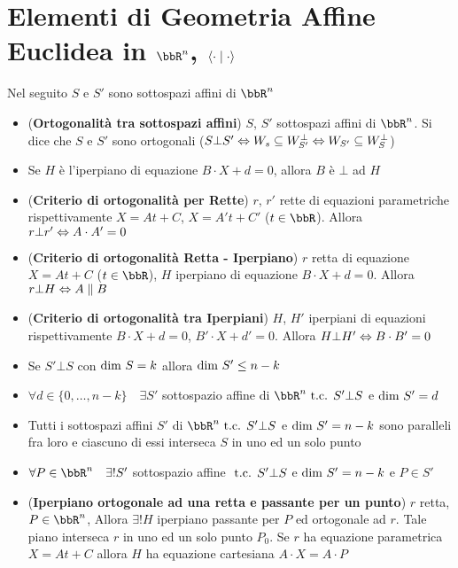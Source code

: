 \documentclass[a4paper,NoNotes,GeneralMath]{stdmdoc}
\begin{document}
	\section*{Elementi di Geometria Affine Euclidea in $\bbR^n$, $\langle \cdot \mid \cdot \rangle$}
	Nel seguito $S$ e $S'$ sono sottospazi affini di $\bbR^n$
	\begin{itemize}
		\item ({\bf Ortogonalità tra sottospazi affini}) $S$, $S'$ sottospazi affini di $\bbR^n$. Si dice che $S$ e $S'$ sono ortogonali ($S \bot S' \Leftrightarrow W_s \subseteq W_{S'}^\bot \Leftrightarrow W_{S'} \subseteq W_{S}^\bot$)
		\item Se $H$ è l'iperpiano di equazione $B\cdot X + d = 0$, allora $B$ è $\bot$ ad $H$		
		\item ({\bf Criterio di ortogonalità per Rette}) $r$, $r'$ rette di equazioni parametriche rispettivamente $X=At+C$, $X=A't+C'$ ($t \in \bbR$). Allora $r \bot r' \Leftrightarrow A\cdot A' = 0$
		\item ({\bf Criterio di ortogonalità Retta - Iperpiano}) $r$ retta di equazione $X=At+C$ ($t \in \bbR$), $H$ iperpiano di equazione $B \cdot X + d = 0$. Allora $r \bot H \Leftrightarrow A \parallel B$
		\item ({\bf Criterio di ortogonalità tra Iperpiani}) $H$, $H'$ iperpiani di equazioni rispettivamente $B \cdot X + d = 0$, $B' \cdot X + d' = 0$. Allora $H \bot H' \Leftrightarrow B \cdot B' = 0$
		\item Se $S' \bot S$ con $\mbox{dim } S = k$ allora $\mbox{dim } S' \le n-k$
		\item $\forall d \in \{0, \ldots, n-k\} \quad \exists S'$ sottospazio affine di $\bbR^n \tc S' \bot S$ e $\mbox{dim } S' = d$
		\item Tutti i sottospazi affini $S'$ di $\bbR^n \tc S' \bot S$ e $\mbox{dim } S' = n-k$ sono paralleli fra loro e ciascuno di essi interseca $S$ in uno ed un solo punto
		\item $\forall P \in \bbR^n \quad \exists ! S'$ sottospazio affine $\mbox{ t.c. } S' \bot S$ e $\mbox{dim } S' = n-k$ e $P \in S'$
		\item ({\bf Iperpiano ortogonale ad una retta e passante per un punto}) $r$ retta, $P \in \bbR^n$, Allora $\exists ! H$ iperpiano passante per $P$ ed ortogonale ad $r$. Tale piano interseca $r$ in uno ed un solo punto $P_0$. Se $r$ ha equazione parametrica $X = At+C$ allora $H$ ha equazione cartesiana $A\cdot X = A \cdot P$
	\end{itemize}
\end{document}
